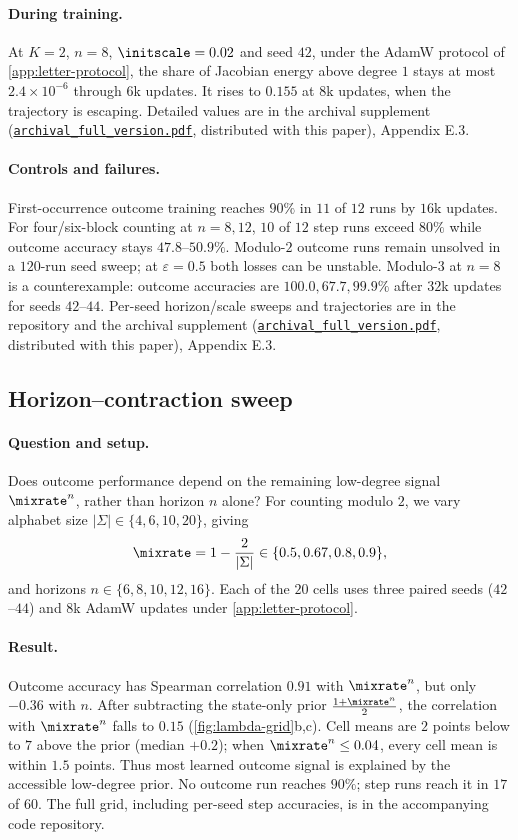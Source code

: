 \paragraph{During training.} At $K=2$, $n=8$, $\initscale=0.02$ and seed $42$, under the AdamW protocol of \cref{app:letter-protocol},
the share of Jacobian energy above degree $1$ stays at most $2.4\times10^{-6}$ through $6$k updates.
It rises to $0.155$ at $8$k updates, when the trajectory is escaping. Detailed values are in the archival supplement (\href{archival_full_version.pdf}{\texttt{archival\_full\_version.pdf}}, distributed with this paper), Appendix E.3.



\paragraph{Controls and failures.}
First-occurrence outcome training reaches $90\%$ in $11$ of $12$ runs by $16$k updates.
For four/six-block counting at $n=8,12$, $10$ of $12$ step runs exceed $80\%$ while
outcome accuracy stays $47.8$--$50.9\%$. Modulo-$2$ outcome runs remain unsolved
in a $120$-run seed sweep; at $\varepsilon=0.5$ both losses can be unstable.
Modulo-$3$ at $n=8$ is a counterexample: outcome accuracies are
$100.0,67.7,99.9\%$ after $32$k updates for seeds $42$--$44$.
Per-seed horizon/scale sweeps and trajectories are in the repository and
the archival supplement (\href{archival_full_version.pdf}{\texttt{archival\_full\_version.pdf}}, distributed with this paper), Appendix E.3.

\subsection{Horizon--contraction sweep}
\label{app:exp-lambda}
\paragraph{Question and setup.} Does outcome performance depend on the remaining low-degree signal $\mixrate^n$, rather than horizon $n$ alone?
For counting modulo $2$, we vary alphabet size $|\Sigma|\in\{4,6,10,20\}$, giving
\[
 \mixrate=1-\frac{2}{|\Sigma|}\in\{0.5,0.67,0.8,0.9\},
\]
and horizons $n\in\{6,8,10,12,16\}$. Each of the $20$ cells uses three paired seeds ($42$--$44$) and $8$k AdamW updates
under \cref{app:letter-protocol}.

\paragraph{Result.} Outcome accuracy has Spearman correlation $0.91$ with $\mixrate^n$, but only $-0.36$ with $n$.
After subtracting the state-only prior $\frac{1+\mixrate^n}{2}$, the correlation with $\mixrate^n$ falls to $0.15$ (\cref{fig:lambda-grid}b,c).
Cell means are $2$ points below to $7$ above the prior (median $+0.2$); when $\mixrate^n\le0.04$, every cell mean is within $1.5$ points.
Thus most learned outcome signal is explained by the accessible low-degree prior. No outcome run reaches $90\%$;
step runs reach it in $17$ of $60$. The full grid, including per-seed step accuracies, is in the accompanying code repository.

